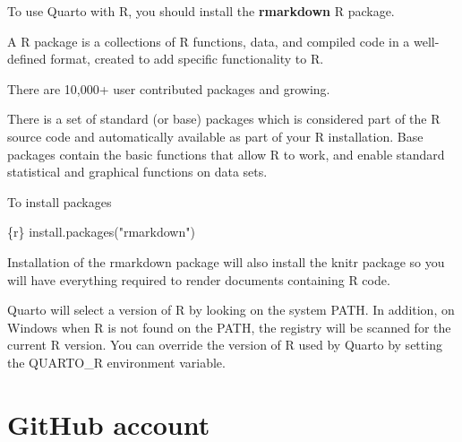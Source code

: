\documentclass[
  letterpaper,
  DIV=11,
  numbers=noendperiod]{scrreprt}
\newenvironment{Shaded}{\begin{snugshade}}{\end{snugshade}}
\newcommand{\FunctionTok}[1]{\textcolor[rgb]{0.28,0.35,0.67}{#1}}
\newcommand{\InformationTok}[1]{\textcolor[rgb]{0.37,0.37,0.37}{#1}}
\newcommand{\NormalTok}[1]{\textcolor[rgb]{0.00,0.23,0.31}{#1}}
\newcommand{\StringTok}[1]{\textcolor[rgb]{0.13,0.47,0.30}{#1}}
\begin{document}
To use Quarto with R, you should install the \textbf{rmarkdown} R
package.

\begin{tcolorbox}[enhanced jigsaw, leftrule=.75mm, breakable, coltitle=black, opacitybacktitle=0.6, colframe=quarto-callout-important-color-frame, bottomrule=.15mm, toptitle=1mm, left=2mm, opacityback=0, colbacktitle=quarto-callout-important-color!10!white, rightrule=.15mm, bottomtitle=1mm, arc=.35mm, titlerule=0mm, title=\textcolor{quarto-callout-important-color}{\faExclamation}\hspace{0.5em}{Important}, toprule=.15mm, colback=white]
A R package is a collections of R functions, data, and compiled code in
a well-defined format, created to add specific functionality to R.

There are 10,000+ user contributed packages and growing.

There is a set of standard (or base) packages which is considered part
of the R source code and automatically available as part of your R
installation. Base packages contain the basic functions that allow R to
work, and enable standard statistical and graphical functions on data
sets.
\end{tcolorbox}

To install packages

\begin{Shaded}
\begin{Highlighting}[]
\InformationTok{\textasciigrave{}\textasciigrave{}\textasciigrave{}\{r\}}
\FunctionTok{install.packages}\NormalTok{(}\StringTok{"rmarkdown"}\NormalTok{)}
\InformationTok{\textasciigrave{}\textasciigrave{}\textasciigrave{}}
\end{Highlighting}
\end{Shaded}

Installation of the rmarkdown package will also install the knitr
package so you will have everything required to render documents
containing R code.

Quarto will select a version of R by looking on the system PATH. In
addition, on Windows when R is not found on the PATH, the registry will
be scanned for the current R version. You can override the version of R
used by Quarto by setting the QUARTO\_R environment variable.

\hypertarget{github-account}{%
\section{GitHub account}\label{github-account}}
\end{document}
